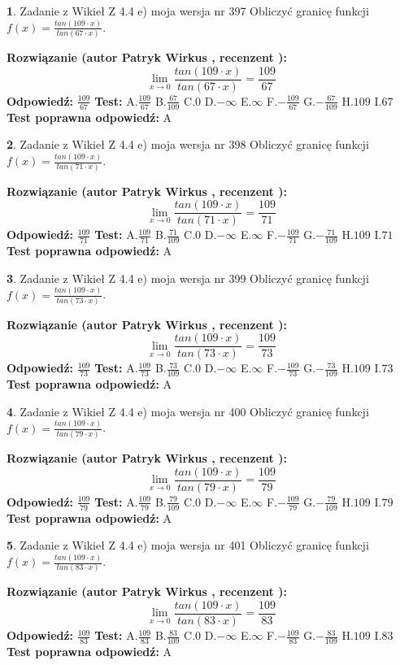 \documentclass[12pt, a4paper]{article}
\theoremstyle{definition} %
\newtheorem{zad}{}
\newcommand{\zadStart}[1]{\begin{zad}#1\newline}
\newcommand{\zadStop}{\end{zad}}
\newcommand{\rozwStart}[2]{\noindent \textbf{Rozwiązanie (autor #1 , recenzent #2): }\newline}
\newcommand{\rozwStop}{\newline}
\newcommand{\odpStart}{\noindent \textbf{Odpowiedź:}\newline}
\newcommand{\odpStop}{\newline}
\newcommand{\testStart}{\noindent \textbf{Test:}\newline}
\newcommand{\testStop}{\newline}
\newcommand{\kluczStart}{\noindent \textbf{Test poprawna odpowiedź:}\newline}
\newcommand{\kluczStop}{\newline}
\begin{document}
\zadStart{Zadanie z Wikieł Z 4.4 e) moja wersja nr 397}
Obliczyć granicę funkcji $f(x)=\frac{tan(109\cdot x)}{tan(67\cdot x)}$.
\zadStop
\rozwStart{Patryk Wirkus}{}
$$\lim\limits_{x\to 0}\frac{tan(109\cdot x)}{tan(67\cdot x)}=
\frac{109}{67}$$
\rozwStop
\odpStart
$\frac{109}{67}$
\odpStop
\testStart
A.$\frac{109}{67}$
B.$\frac{67}{109}$
C.$0$
D.$-\infty$
E.$\infty$
F.$-\frac{109}{67}$
G.$-\frac{67}{109}$
H.$109$
I.$67$
\testStop
\kluczStart
A
\kluczStop



\zadStart{Zadanie z Wikieł Z 4.4 e) moja wersja nr 398}
Obliczyć granicę funkcji $f(x)=\frac{tan(109\cdot x)}{tan(71\cdot x)}$.
\zadStop
\rozwStart{Patryk Wirkus}{}
$$\lim\limits_{x\to 0}\frac{tan(109\cdot x)}{tan(71\cdot x)}=
\frac{109}{71}$$
\rozwStop
\odpStart
$\frac{109}{71}$
\odpStop
\testStart
A.$\frac{109}{71}$
B.$\frac{71}{109}$
C.$0$
D.$-\infty$
E.$\infty$
F.$-\frac{109}{71}$
G.$-\frac{71}{109}$
H.$109$
I.$71$
\testStop
\kluczStart
A
\kluczStop



\zadStart{Zadanie z Wikieł Z 4.4 e) moja wersja nr 399}
Obliczyć granicę funkcji $f(x)=\frac{tan(109\cdot x)}{tan(73\cdot x)}$.
\zadStop
\rozwStart{Patryk Wirkus}{}
$$\lim\limits_{x\to 0}\frac{tan(109\cdot x)}{tan(73\cdot x)}=
\frac{109}{73}$$
\rozwStop
\odpStart
$\frac{109}{73}$
\odpStop
\testStart
A.$\frac{109}{73}$
B.$\frac{73}{109}$
C.$0$
D.$-\infty$
E.$\infty$
F.$-\frac{109}{73}$
G.$-\frac{73}{109}$
H.$109$
I.$73$
\testStop
\kluczStart
A
\kluczStop



\zadStart{Zadanie z Wikieł Z 4.4 e) moja wersja nr 400}
Obliczyć granicę funkcji $f(x)=\frac{tan(109\cdot x)}{tan(79\cdot x)}$.
\zadStop
\rozwStart{Patryk Wirkus}{}
$$\lim\limits_{x\to 0}\frac{tan(109\cdot x)}{tan(79\cdot x)}=
\frac{109}{79}$$
\rozwStop
\odpStart
$\frac{109}{79}$
\odpStop
\testStart
A.$\frac{109}{79}$
B.$\frac{79}{109}$
C.$0$
D.$-\infty$
E.$\infty$
F.$-\frac{109}{79}$
G.$-\frac{79}{109}$
H.$109$
I.$79$
\testStop
\kluczStart
A
\kluczStop



\zadStart{Zadanie z Wikieł Z 4.4 e) moja wersja nr 401}
Obliczyć granicę funkcji $f(x)=\frac{tan(109\cdot x)}{tan(83\cdot x)}$.
\zadStop
\rozwStart{Patryk Wirkus}{}
$$\lim\limits_{x\to 0}\frac{tan(109\cdot x)}{tan(83\cdot x)}=
\frac{109}{83}$$
\rozwStop
\odpStart
$\frac{109}{83}$
\odpStop
\testStart
A.$\frac{109}{83}$
B.$\frac{83}{109}$
C.$0$
D.$-\infty$
E.$\infty$
F.$-\frac{109}{83}$
G.$-\frac{83}{109}$
H.$109$
I.$83$
\testStop
\kluczStart
A
\kluczStop
\end{document}
